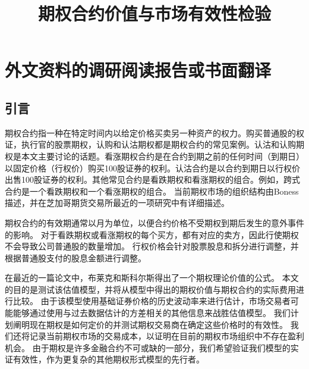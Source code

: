 \chapter{外文资料的调研阅读报告或书面翻译}
\title{期权合约价值与市场有效性检验}
\section{引言}
\par{期权合约指一种在特定时间内以给定价格买卖另一种资产的权力。购买普通股的权证，执行官的股票期权，认购和认沽期权都是期权合约的常见案例。认沽和认购期权是本文主要讨论的话题。看涨期权合约是在合约到期之前的任何时间（到期日）以固定价格（行权价）购买100股证券的权利。认沽合约是以合约到期日以行权价出售100股证券的权利。其他常见合约是看跌期权和看涨期权的组合。例如，跨式合约是一个看跌期权和一个看涨期权的组合。
当前期权市场的组织结构由Boness描述，并在芝加哥期货交易所最近的一项研究中有详细描述。}

\par{期权合约的有效期通常以月为单位，以便合约价格不受期权到期后发生的意外事件的影响。 对于看跌期权或看涨期权的每个买方，都有对应的卖方，因此行使期权不会导致公司普通股的数量增加。 行权价格会针对股票股息和拆分进行调整，并根据普通股支付的股息金额进行调整。}
\par{
在最近的一篇论文中，布莱克和斯科尔斯得出了一个期权理论价值的公式。 本文的目的是测试该估值模型，并将从模型中得出的期权价值与期权合约的实际费用进行比较。 由于该模型使用基础证券价格的历史波动率来进行估计，市场交易者可能能够通过使用与过去数据估计的方差相关的其他信息来战胜估值模型。 我们计划阐明现在期权是如何定价的并测试期权交易商在确定这些价格时的有效性。 我们还将记录当前期权市场的交易成本，以证明在目前的期权市场组织中不存在盈利机会。 由于期权是许多金融合约不可或缺的一部分，我们希望验证我们模型的实证有效性，作为更复杂的其他期权形式模型的先行者。}